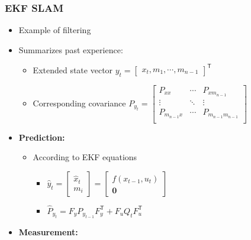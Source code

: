 \documentclass[a4paper]{article}
\newcommand{\transpose}{\mathsf{T}}
\begin{document}
\subsubsection{EKF SLAM}
\begin{itemize}
    \item Example of filtering
    \item Summarizes past experience:
        \begin{itemize}
            \item Extended state vector $y_t =
                \begin{bmatrix}
                    x_t,  m_1, \cdots, m_{n-1}
                \end{bmatrix}^\transpose$
            \item Corresponding covariance $P_{y_t} =
                \begin{bmatrix}
                    P_{xx} & \cdots & P_{xm_{n-1}} \\
                    \vdots & \ddots & \vdots \\
                    P_{m_{n-1}x} & \cdots & P_{m_{n-1}m_{n-1}} \\
                \end{bmatrix}$
        \end{itemize}
    \item[S1)] \textbf{Prediction:}
        \begin{itemize}
            \item According to EKF equations
                \begin{itemize}
                    \item $\hat y_t =
                        \begin{bmatrix}
                          \hat x_t \\
                          m_i
                        \end{bmatrix} =
                        \begin{bmatrix}
                          f(x_{t-1}, u_t) \\
                          \mathbf 0
                        \end{bmatrix}$
                    \item $\hat P_{y_t} = F_y P_{y_{t-1}}F_y^\transpose + F_uQ_tF_u^\transpose$
                \end{itemize}
        \end{itemize}
    \item[S2)] \textbf{Measurement:}
        \begin{itemize}

\end{itemize}
\end{itemize}
\end{document}

